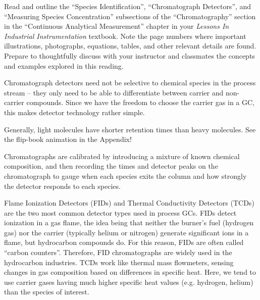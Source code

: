 

Read and outline the ``Species Identification'', ``Chromatograph Detectors'', and ``Measuring Species Concentration'' subsections of the ``Chromatography'' section in the ``Continuous Analytical Measurement'' chapter in your {\it Lessons In Industrial Instrumentation} textbook.  Note the page numbers where important illustrations, photographs, equations, tables, and other relevant details are found.  Prepare to thoughtfully discuss with your instructor and classmates the concepts and examples explored in this reading.














Chromatograph detectors need not be selective to chemical species in the process stream -- they only need to be able to differentiate between carrier and non-carrier compounds.  Since we have the freedom to choose the carrier gas in a GC, this makes detector technology rather simple.

\vskip 10pt

Generally, light molecules have shorter retention times than heavy molecules.  See the flip-book animation in the Appendix!

\vskip 10pt

Chromatographs are calibrated by introducing a mixture of known chemical composition, and then recording the times and detector peaks on the chromatograph to gauge when each species exits the column and how strongly the detector responds to each species.

\vskip 10pt

Flame Ionization Detectors (FIDs) and Thermal Conductivity Detectors (TCDs) are the two most common detector types used in process GCs.  FIDs detect ionization in a gas flame, the idea being that neither the burner's fuel (hydrogen gas) nor the carrier (typically helium or nitrogen) generate significant ions in a flame, but hydrocarbon compounds do.  For this reason, FIDs are often called ``carbon counters''.  Therefore, FID chromatographs are widely used in the hydrocarbon industries.  TCDs work like thermal mass flowmeters, sensing changes in gas composition based on differences in specific heat.  Here, we tend to use carrier gases having much higher specific heat values (e.g. hydrogen, helium) than the species of interest.

